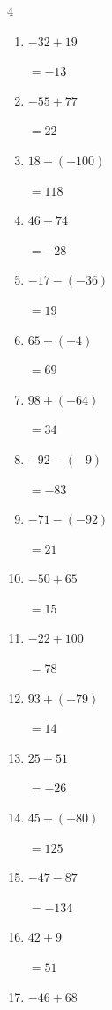 \begin{multicols}{4}
\begin{enumerate}
        $=-14$

  \item $-32+19$

        $=-13$

  \item $-55+77$

        $=22$

  \item $18-(-100)$

        $=118$

  \item $46-74$

        $=-28$

  \item $-17-(-36)$

        $=19$

  \item $65-(-4)$

        $=69$

\columnbreak %

  \item $98+(-64)$

        $=34$

  \item $-92-(-9)$

        $=-83$

  \item $-71-(-92)$

        $=21$

  \item $-50+65$

        $=15$

  \item $-22+100$

        $=78$

  \item $93+(-79)$

        $=14$

  \item $25-51$

        $=-26$

  \item $45-(-80)$

        $=125$

  \item $-47-87$

        $=-134$

  \item $42+9$

        $=51$

  \item $-46+68$


\end{enumerate}
\end{multicols}
